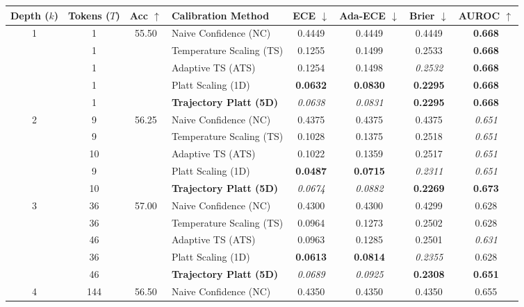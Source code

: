 \begin{table}[t]
\setlength{\tabcolsep}{4pt}
\renewcommand{\arraystretch}{1.05}
\centering
\footnotesize
\begin{tabular}{ccclcccc}
\toprule
\textbf{Depth ($k$)} & \textbf{Tokens ($T$)} & \textbf{Acc} $\uparrow$ & \textbf{Calibration Method} & \textbf{ECE} $\downarrow$ & \textbf{Ada-ECE} $\downarrow$ & \textbf{Brier} $\downarrow$ & \textbf{AUROC} $\uparrow$ \\
\midrule
\multirow{5}{*}{1} & 1 & \multirow{5}{*}{55.50} & Naive Confidence (NC) & 0.4449 & 0.4449 & 0.4449 & \textbf{0.668} \\
 & 1 &  & Temperature Scaling (TS) & 0.1255 & 0.1499 & 0.2533 & \textbf{0.668} \\
 & 1 &  & Adaptive TS (ATS) & 0.1254 & 0.1498 & \textit{0.2532} & \textbf{0.668} \\
 & 1 &  & Platt Scaling (1D) & \textbf{0.0632} & \textbf{0.0830} & \textbf{0.2295} & \textbf{0.668} \\
 & 1 &  & \textbf{Trajectory Platt (5D)} & \textit{0.0638} & \textit{0.0831} & \textbf{0.2295} & \textbf{0.668} \\
\midrule
\multirow{5}{*}{2} & 9 & \multirow{5}{*}{56.25} & Naive Confidence (NC) & 0.4375 & 0.4375 & 0.4375 & \textit{0.651} \\
 & 9 &  & Temperature Scaling (TS) & 0.1028 & 0.1375 & 0.2518 & \textit{0.651} \\
 & 10 &  & Adaptive TS (ATS) & 0.1022 & 0.1359 & 0.2517 & \textit{0.651} \\
 & 9 &  & Platt Scaling (1D) & \textbf{0.0487} & \textbf{0.0715} & \textit{0.2311} & \textit{0.651} \\
 & 10 &  & \textbf{Trajectory Platt (5D)} & \textit{0.0674} & \textit{0.0882} & \textbf{0.2269} & \textbf{0.673} \\
\midrule
\multirow{5}{*}{3} & 36 & \multirow{5}{*}{57.00} & Naive Confidence (NC) & 0.4300 & 0.4300 & 0.4299 & 0.628 \\
 & 36 &  & Temperature Scaling (TS) & 0.0964 & 0.1273 & 0.2502 & 0.628 \\
 & 46 &  & Adaptive TS (ATS) & 0.0963 & 0.1285 & 0.2501 & \textit{0.631} \\
 & 36 &  & Platt Scaling (1D) & \textbf{0.0613} & \textbf{0.0814} & \textit{0.2355} & 0.628 \\
 & 46 &  & \textbf{Trajectory Platt (5D)} & \textit{0.0689} & \textit{0.0925} & \textbf{0.2308} & \textbf{0.651} \\
\midrule
\multirow{5}{*}{4} & 144 & \multirow{5}{*}{56.50} & Naive Confidence (NC) & 0.4350 & 0.4350 & 0.4350 & 0.655 \\

\end{tabular}
\end{table}
